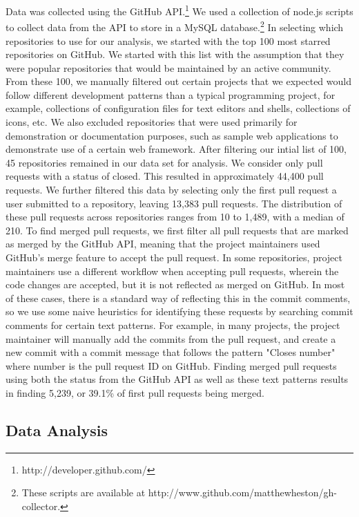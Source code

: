 \documentclass{sigchi}
\begin{document}
Data was collected using the GitHub API.\footnote{http://developer.github.com/}
We used a collection of node.js scripts to collect data from the API to store in
a MySQL database.\footnote{These scripts are available at
http://www.github.com/matthewheston/gh-collector.} In selecting which
repositories to use for our analysis, we started with the top 100 most starred
repositories on GitHub. We started with this list with the assumption that they
were popular repositories that would be maintained by an active community. From
these 100, we manually filtered out certain projects that we expected would
follow different development patterns than a typical programming project, for
example, collections of configuration files for text editors and shells,
collections of icons, etc. We also excluded repositories that were used
primarily for demonstration or documentation purposes, such as sample web
applications to demonstrate use of a certain web framework. After filtering our
intial list of 100, 45 repositories remained in our data set for analysis. We
consider only pull requests with a status of closed. This resulted in
approximately 44,400 pull requests. We further filtered this data by selecting
only the first pull request a user submitted to a repository, leaving 13,383
pull requests. The distribution of these pull requests across repositories
ranges from 10 to 1,489, with a median of 210. To find merged pull requests, we
first filter all pull requests that are marked as merged by the GitHub API,
meaning that the project maintainers used GitHub's merge feature to accept the
pull request. In some repositories, project maintainers use a different workflow
when accepting pull requests, wherein the code changes are accepted, but it is
not reflected as merged on GitHub. In most of these cases, there is a standard
way of reflecting this in the commit comments, so we use some naive heuristics
for identifying these requests by searching commit comments for certain text
patterns. For example, in many projects, the project maintainer will manually
add the commits from the pull request, and create a new commit with a commit
message that follows the pattern "Closes {number}" where {number} is the pull
request ID on GitHub. Finding merged pull requests using both the status from
the GitHub API as well as these text patterns results in finding 5,239, or
39.1\% of first pull requests being merged.

\subsection{Data Analysis} \label{sec:data_analysis}
\end{document}
